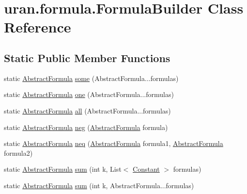 \hypertarget{classuran_1_1formula_1_1_formula_builder}{}\section{uran.\+formula.\+Formula\+Builder Class Reference}
\label{classuran_1_1formula_1_1_formula_builder}
\subsection*{Static Public Member Functions}
\begin{DoxyCompactItemize}
\item 
static \hyperlink{classuran_1_1formula_1_1_abstract_formula}{Abstract\+Formula} \hyperlink{classuran_1_1formula_1_1_formula_builder_a80fc1724f6b5c5e9834568e59a4303d9}{some} (Abstract\+Formula...\+formulas)
\item 
static \hyperlink{classuran_1_1formula_1_1_abstract_formula}{Abstract\+Formula} \hyperlink{classuran_1_1formula_1_1_formula_builder_adb0d9418878555814f8234e8e6953b05}{one} (Abstract\+Formula...\+formulas)
\item 
static \hyperlink{classuran_1_1formula_1_1_abstract_formula}{Abstract\+Formula} \hyperlink{classuran_1_1formula_1_1_formula_builder_a0fd2c2839c928fd3bd2bab3232ff7cca}{all} (Abstract\+Formula...\+formulas)
\item 
static \hyperlink{classuran_1_1formula_1_1_abstract_formula}{Abstract\+Formula} \hyperlink{classuran_1_1formula_1_1_formula_builder_ac4c1b4e0b80ab6e32144d64887e0559c}{neg} (\hyperlink{classuran_1_1formula_1_1_abstract_formula}{Abstract\+Formula} formula)
\item 
static \hyperlink{classuran_1_1formula_1_1_abstract_formula}{Abstract\+Formula} \hyperlink{classuran_1_1formula_1_1_formula_builder_ad835c1c078e8d8cce065f8d4815e2f91}{neq} (\hyperlink{classuran_1_1formula_1_1_abstract_formula}{Abstract\+Formula} formula1, \hyperlink{classuran_1_1formula_1_1_abstract_formula}{Abstract\+Formula} formula2)
\item 
static \hyperlink{classuran_1_1formula_1_1_abstract_formula}{Abstract\+Formula} \hyperlink{classuran_1_1formula_1_1_formula_builder_af31ff9ba719cd2591cbd88a1231d6702}{sum} (int k, List$<$ \hyperlink{classuran_1_1formula_1_1_constant}{Constant} $>$ formulas)
\item 
static \hyperlink{classuran_1_1formula_1_1_abstract_formula}{Abstract\+Formula} \hyperlink{classuran_1_1formula_1_1_formula_builder_a11cfdf22fa5d102d58ee1a08f20c92c3}{sum} (int k, Abstract\+Formula...\+formulas)

\end{DoxyCompactItemize}

